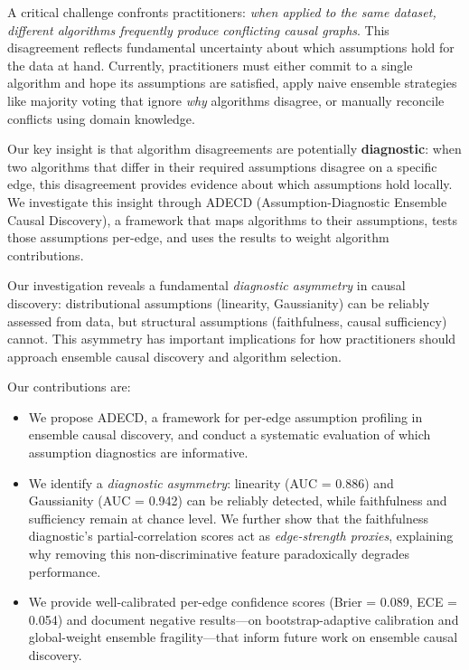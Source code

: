 \documentclass{article}
\newcommand{\adecd}{\textsc{ADECD}}
\begin{document}
A critical challenge confronts practitioners: \emph{when applied to the same dataset, different algorithms frequently produce conflicting causal graphs}.
This disagreement reflects fundamental uncertainty about which assumptions hold for the data at hand.
Currently, practitioners must either commit to a single algorithm and hope its assumptions are satisfied, apply naive ensemble strategies like majority voting that ignore \emph{why} algorithms disagree, or manually reconcile conflicts using domain knowledge.

Our key insight is that algorithm disagreements are potentially \textbf{diagnostic}: when two algorithms that differ in their required assumptions disagree on a specific edge, this disagreement provides evidence about which assumptions hold locally.
We investigate this insight through \adecd{} (Assumption-Diagnostic Ensemble Causal Discovery), a framework that maps algorithms to their assumptions, tests those assumptions per-edge, and uses the results to weight algorithm contributions.

Our investigation reveals a fundamental \emph{diagnostic asymmetry} in causal discovery: distributional assumptions (linearity, Gaussianity) can be reliably assessed from data, but structural assumptions (faithfulness, causal sufficiency) cannot.
This asymmetry has important implications for how practitioners should approach ensemble causal discovery and algorithm selection.

Our contributions are:
\begin{itemize}
    \item We propose \adecd{}, a framework for per-edge assumption profiling in ensemble causal discovery, and conduct a systematic evaluation of which assumption diagnostics are informative.
    \item We identify a \emph{diagnostic asymmetry}: linearity (AUC = 0.886) and Gaussianity (AUC = 0.942) can be reliably detected, while faithfulness and sufficiency remain at chance level. We further show that the faithfulness diagnostic's partial-correlation scores act as \emph{edge-strength proxies}, explaining why removing this non-discriminative feature paradoxically degrades performance.
    \item We provide well-calibrated per-edge confidence scores (Brier = 0.089, ECE = 0.054) and document negative results---on bootstrap-adaptive calibration and global-weight ensemble fragility---that inform future work on ensemble causal discovery.
\end{itemize}
\end{document}
